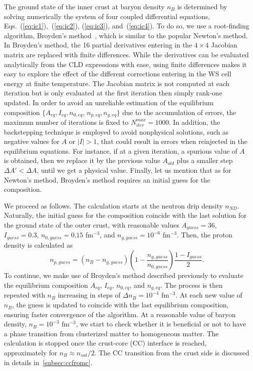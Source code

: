The ground state of the inner crust at baryon density $n_B$ 
is determined by solving numerically the system of four coupled
differential equations, Eqs.~(\ref{eq:ic1}),~(\ref{eq:ic2}), (\ref{eq:ic3}),
and~(\ref{eq:ic4}). To do so, we use a root-finding algorithm, Broyden's
method~\cite{Broyden1965}, which is similar to the popular Newton's method. In 
Broyden's method, the 16 partial derivatives entering in the $4\times 4$ Jacobian 
matrix are replaced with finite differences. While the derivatives can be
evaluated analytically from the CLD expressions with ease, using finite
differences makes it easy to explore the effect of the different corrections 
entering in the WS cell energy at finite temperature. The Jacobian matrix 
is not computed at each iteration but is only evaluated at the first iteration 
then simply rank-one updated. In order to avoid an unreliable estimation of the
equilibrium composition $\{A_{eq},I_{eq},n_{0,eq}$, $n_{p,eq},n_{g,eq}\}$ due to
the accumulation of errors, the maximum number of iterations is fixed to
$N_{iter}^{max} = 1000$.
In addition, the backstepping technique is employed to avoid nonphysical solutions,
such as negative values for $A$ or $|I| > 1$, that could result in
errors when reinjected in the equilibrium equations. For instance, if at a given 
iteration, a spurious value of $A$ is obtained, then we replace it by the
previous value $A_{old}$ plus a smaller step $\Delta A' < \Delta A$, until we 
get a physical value. Finally, let us mention that as for Newton's 
method, Broyden's method requires an initial guess for the composition.

We proceed as follows. The calculation starts at the neutron drip density
$n_{ND}$. Naturally, the initial guess for the composition coincide with the
last solution for the ground state of the outer crust, with reasonable values 
$A_{guess} = 36$, $I_{guess} = 0.3$, $n_{0,guess} = 0.15$ fm$^{-3}$, and 
$n_{g,guess} = 10^{-6}$ fm$^{-3}$. Then, the proton density is calculated
as
%
\begin{equation}
  n_{p,guess} =
  (n_B-n_{g,guess})\left(1-\frac{n_{g,guess}}{n_{0,guess}}\right)
  \frac{1-I_{guess}}{2}.
\end{equation}
%
To continue, we make use of Broyden's method described previously to evaluate 
the equilibrium composition $A_{eq}$, $I_{eq}$, $n_{0,eq}$, and $n_{g,eq}$. The
process is then repeated with $n_B$ increasing in steps of 
$\Delta n_B = 10^{-4}$ fm$^{-3}$. At each new value of $n_B$, the guess
is updated to coincide with the last equilibrium composition, ensuring faster
convergence of the algorithm. At a reasonable value of baryon density, $n_B =
10^{-3}$ fm$^{-3}$, we start to check whether it is beneficial or not to have a
phase transition from clusterized matter to homogeneous matter. The calculation 
is stopped once the crust-core (CC) interface is reached, approximately for $n_B
\approx n_{sat}/2$. The CC transition from the crust side is discussed 
in details in~\ref{subsec:ccfromc}.

